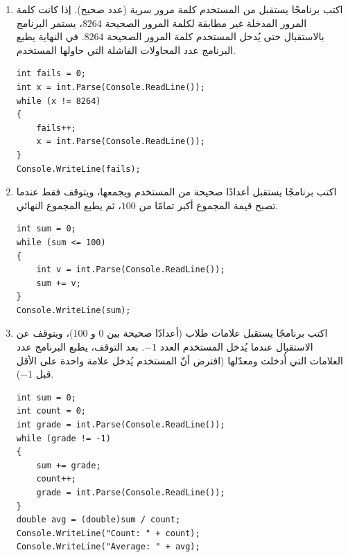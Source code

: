 \documentclass[14pt]{extarticle}
\begin{document}
\begin{enumerate}[itemsep=1em]
\item اكتب برنامجًا يستقبل من المستخدم كلمة مرور سرية (عدد صحيح). إذا كانت كلمة المرور المدخلة غير مطابقة لكلمة المرور الصحيحة $8264$، يستمر البرنامج بالاستقبال حتى يُدخل المستخدم كلمة المرور الصحيحة $8264$. في النهاية يطبع البرنامج عدد المحاولات الفاشلة التي حاولها المستخدم.
\ifwithsols
\begin{boxSolution}
\begin{english}
\begin{verbatim}
int fails = 0;
int x = int.Parse(Console.ReadLine());
while (x != 8264)
{
    fails++;
    x = int.Parse(Console.ReadLine());
}
Console.WriteLine(fails);
\end{verbatim}
\end{english}
\end{boxSolution}
\fi
\filbreak

\item اكتب برنامجًا يستقبل أعدادًا صحيحة من المستخدم ويجمعها، ويتوقف فقط عندما تصبح قيمة المجموع أكبر تمامًا من $100$، ثم يطبع المجموع النهائي.
\ifwithsols
\begin{boxSolution}
\begin{english}
\begin{verbatim}
int sum = 0;
while (sum <= 100)
{
    int v = int.Parse(Console.ReadLine());
    sum += v;
}
Console.WriteLine(sum);
\end{verbatim}
\end{english}
\end{boxSolution}
\fi
\filbreak

\item اكتب برنامجًا يستقبل علامات طلاب (أعدادًا صحيحة بين $0$ و $100$)، ويتوقف عن الاستقبال عندما يُدخل المستخدم العدد $-1$. بعد التوقف، يطبع البرنامج عدد العلامات التي أُدخلت ومعدّلها (افترض أنّ المستخدم يُدخل علامة واحدة على الأقل قبل $-1$).
\ifwithsols
\begin{boxSolution}
\begin{english}
\begin{verbatim}
int sum = 0;
int count = 0;
int grade = int.Parse(Console.ReadLine());
while (grade != -1)
{
    sum += grade;
    count++;
    grade = int.Parse(Console.ReadLine());
}
double avg = (double)sum / count;
Console.WriteLine("Count: " + count);
Console.WriteLine("Average: " + avg);
\end{verbatim}
\end{english}
\end{boxSolution}
\fi
\filbreak


\end{enumerate}
\end{document}
